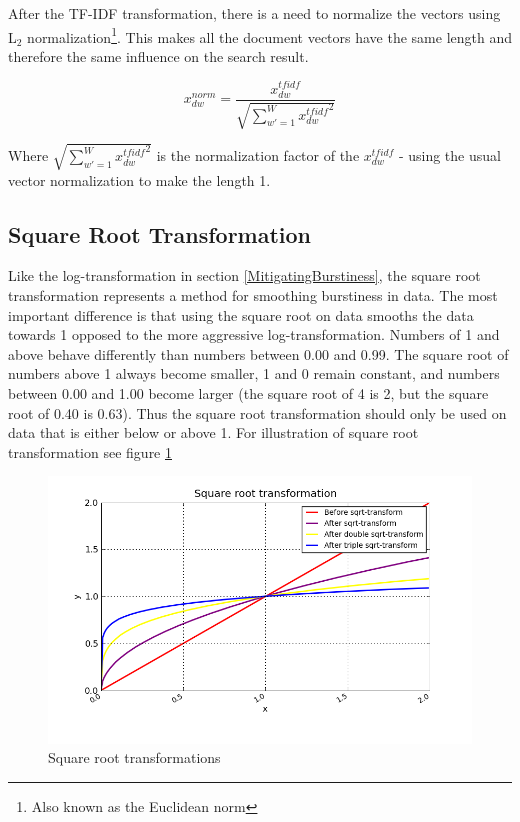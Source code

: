 After the TF-IDF transformation, there is a need to normalize the
vectors using L$_2$ normalization\footnote{Also known as the
  Euclidean norm}. This makes all the document vectors have the same
length and therefore the same influence on the search result.

\[
x_{dw}^{norm} = \frac{x_{dw}^{tfidf}}{\sqrt{\sum_{w\prime = 1}^{W} {x_{dw}^{tfidf}}^{2}}}
\]

Where $\sqrt{\sum_{w\prime = 1}^{W} {x_{dw}^{tfidf}}^{2}}$ is the
normalization factor of the $x_{dw}^{tfidf}$ - using the usual vector
normalization to make the length 1.

\subsection{Square Root Transformation\label{SquareRoot}}

Like the log-transformation in section \ref{MitigatingBurstiness}, the
square root transformation represents a method for smoothing
burstiness in data. The most important difference is that using the
square root on data smooths the data towards 1 opposed to the
more aggressive log-transformation. Numbers of 1 and above behave
differently than numbers between 0.00 and 0.99. The square root of
numbers above 1 always become smaller, 1 and 0 remain constant, and
numbers between 0.00 and 1.00 become larger (the square root of 4 is
2, but the square root of 0.40 is 0.63). Thus the square root
transformation should only be used on data that is either below or
above 1. For illustration of square root transformation see figure
\ref{SqrtTransformations}

\begin{figure}[H]
        \begin{center}
          \includegraphics[width=1.0\textwidth]{barcharts/sqrt_graph.png}
        \end{center}
        \caption{Square root transformations}
        \label{SqrtTransformations}
\end{figure}


